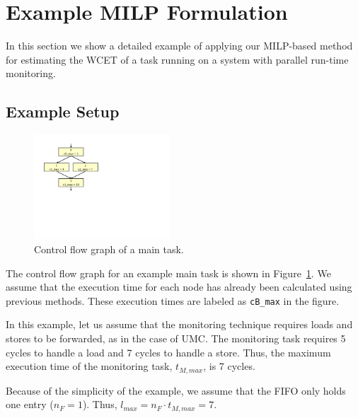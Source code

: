 \section{Example MILP Formulation}
\label{sec:example}


In this section we show a detailed example of applying our MILP-based method
for estimating the WCET of a task running on a system with parallel run-time
monitoring.

\subsection{Example Setup}

\begin{figure}[htb]
  \begin{center}
    \vspace{-0.0in}
    \includegraphics[width=2.0in]{figs/monitoring_wcet/cfg.pdf}
    \vspace{-0.1in}
    \caption{Control flow graph of a main task.}
    \label{fig:app.cfg}
    \vspace{-0.2in}
  \end{center}
\end{figure}

The control flow graph for an example main task is shown in Figure~\ref{fig:app.cfg}. We assume
that the execution time for each node has already been calculated using
previous methods. These execution times are labeled as {\tt cB\_max} in the figure.

In this example, let us assume that the monitoring technique requires loads and stores 
to be forwarded, as
in the case of UMC. The monitoring task requires 5 cycles to handle a load and
7 cycles to handle a store. Thus, the maximum execution time of the monitoring
task, $t_{M, max}$, is 7 cycles.

Because of the simplicity of the example, we assume that the FIFO only holds one entry ($n_F = 1$). Thus, $l_{max} = n_F \cdot t_{M, max} = 7$.

